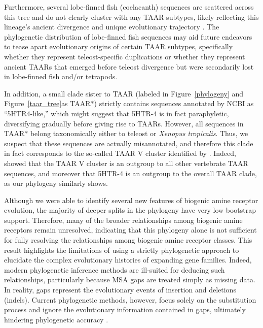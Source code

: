 \documentclass[fleqn,10pt]{wlpeerj}
\begin{document}
Furthermore, several lobe-finned fish (coelacanth) sequences are scattered across this tree and do not clearly cluster with any TAAR subtypes, likely reflecting this lineage's ancient divergence and unique evolutionary trajectory \citep{coelacanth2013}. The phylogenetic distribution of lobe-finned fish sequences may aid future endeavors to tease apart evolutionary origins of certain TAAR subtypes, specifically whether they represent teleost-specific duplications \citep{Gloriametal2005} or whether they represent ancient TAARs that emerged before teleost divergence but were secondarily lost in lobe-finned fish and/or tetrapods.

In addition, a small clade sister to TAAR (labeled in Figure~\ref{phylogeny} and Figure~\ref{taar_tree}as TAAR$\ast$) strictly contains sequences annotated by NCBI as ``5HTR4-like,'' which might suggest that 5HTR-4 is in fact paraphyletic, diversifying gradually before giving rise to TAARs. However, all sequences in TAAR$\ast$ belong taxonomically either to teleost or \emph{Xenopus tropicalis}. Thus, we suspect that these sequences are actually misannotated, and therefore this clade in fact corresponds to the so-called TAAR V cluster identified by \cite{Hashiguchi2007}. Indeed, \cite{Hashiguchi2007} showed that the TAAR V cluster is an outgroup to all other vertebrate TAAR sequences, and moreover that 5HTR-4 is an outgroup to the overall TAAR clade, as our phylogeny similarly shows.

Although we were able to identify several new features of biogenic amine receptor evolution, the majority of deeper splits in the phylogeny have very low bootstrap support. Therefore, many of the broader relationships among biogenic amine receptors remain unresolved, indicating that this phylogeny alone is not sufficient for fully resolving the relationships among biogenic amine receptor classes. This result highlights the limitations of using a strictly phylogenetic approach to elucidate the complex evolutionary histories of expanding gene families. Indeed, modern phylogenetic inference methods are ill-suited for deducing such relationships, particularly because MSA gaps are treated simply as missing data. In reality, gaps represent the evolutionary events of insertion and deletions (indels). Current phylogenetic methods, however, focus solely on the substitution process and ignore the evolutionary information contained in gaps, ultimately hindering phylogenetic accuracy \citep{Morrison2008,Loytynoja2008,Warnow2012,Luanetal2013}. 
\end{document}
